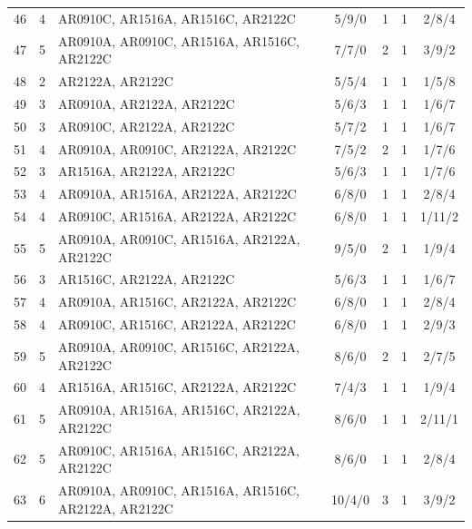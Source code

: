 {\begin{longtable}{rcp{5.4cm}cccc}
46 & 4 & AR0910C, AR1516A, AR1516C, AR2122C & 5/9/0 & 1 & 1 & 2/8/4 \\
47 & 5 & AR0910A, AR0910C, AR1516A, AR1516C, AR2122C & 7/7/0 & 2 & 1 & 3/9/2 \\
48 & 2 & AR2122A, AR2122C & 5/5/4 & 1 & 1 & 1/5/8 \\
49 & 3 & AR0910A, AR2122A, AR2122C & 5/6/3 & 1 & 1 & 1/6/7 \\
50 & 3 & AR0910C, AR2122A, AR2122C & 5/7/2 & 1 & 1 & 1/6/7 \\
51 & 4 & AR0910A, AR0910C, AR2122A, AR2122C & 7/5/2 & 2 & 1 & 1/7/6 \\
52 & 3 & AR1516A, AR2122A, AR2122C & 5/6/3 & 1 & 1 & 1/7/6 \\
53 & 4 & AR0910A, AR1516A, AR2122A, AR2122C & 6/8/0 & 1 & 1 & 2/8/4 \\
54 & 4 & AR0910C, AR1516A, AR2122A, AR2122C & 6/8/0 & 1 & 1 & 1/11/2 \\
55 & 5 & AR0910A, AR0910C, AR1516A, AR2122A, AR2122C & 9/5/0 & 2 & 1 & 1/9/4 \\
56 & 3 & AR1516C, AR2122A, AR2122C & 5/6/3 & 1 & 1 & 1/6/7 \\
57 & 4 & AR0910A, AR1516C, AR2122A, AR2122C & 6/8/0 & 1 & 1 & 2/8/4 \\
58 & 4 & AR0910C, AR1516C, AR2122A, AR2122C & 6/8/0 & 1 & 1 & 2/9/3 \\
59 & 5 & AR0910A, AR0910C, AR1516C, AR2122A, AR2122C & 8/6/0 & 2 & 1 & 2/7/5 \\
60 & 4 & AR1516A, AR1516C, AR2122A, AR2122C & 7/4/3 & 1 & 1 & 1/9/4 \\
61 & 5 & AR0910A, AR1516A, AR1516C, AR2122A, AR2122C & 8/6/0 & 1 & 1 & 2/11/1 \\
62 & 5 & AR0910C, AR1516A, AR1516C, AR2122A, AR2122C & 8/6/0 & 1 & 1 & 2/8/4 \\
63 & 6 & AR0910A, AR0910C, AR1516A, AR1516C, AR2122A, AR2122C & 10/4/0 & 3 & 1 & 3/9/2 \\
\bottomrule
\end{longtable}
}